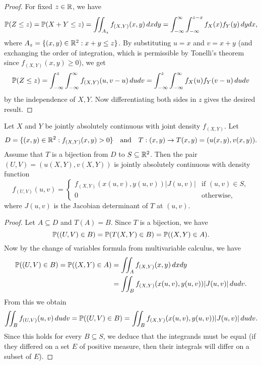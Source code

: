\begin{proof}
  For fixed $z \in \mathbb{R}$, we have
  \[
    \mathbb{P}(Z \le z) = \mathbb{P}(X + Y \le z)
    = \iint_{A_z} f_{(X, Y)}(x, y) \, dx dy
    = \int_{-\infty}^\infty \int_{-\infty}^{z - x} f_X(x) f_Y(y) \, dy dx,
  \]
  where $A_z = \{(x, y) \in \mathbb{R}^2 : x + y \le z\}$.
  By substituting $u = x$ and $v = x + y$ (and
  exchanging the order of integration, which is
  permissible by Tonelli's theorem since $f_{(X, Y)}(x, y) \ge 0$), we get
  \[
    \mathbb{P}(Z \le z)
    = \int_{-\infty}^z \int_{-\infty}^\infty f_{(X, Y)}(u, v - u) \, du dv
    = \int_{-\infty}^z \int_{-\infty}^\infty f_X(u) f_Y(v - u) \, du dv
  \]
  by the independence of $X, Y$. Now differentiating
  both sides in $z$ gives the desired result.
\end{proof}

\begin{theorem}
  Let $X$ and $Y$ be jointly absolutely continuous
  with joint density $f_{(X, Y)}$. Let
  \[
    D = \{(x, y) \in \mathbb{R}^2 : f_{(X, Y)}(x, y) > 0\}
    \quad \text{and} \quad
    T : (x, y) \to T(x, y) = (u(x, y), v(x, y)).
  \]
  Assume that $T$ is a bijection from
  $D$ to $S \subseteq \mathbb{R}^2$. Then the pair
  $(U, V) = (u(X, Y), v(X, Y))$ is jointly absolutely
  continuous with density function
  \[
    f_{(U, V)}(u, v) =
    \begin{cases}
      f_{(X, Y)}(x(u, v), y(u, v)) |J(u, v)| & \text{if $(u, v) \in S$}, \\
      0 & \text{otherwise},
    \end{cases}
  \]
  where $J(u, v)$ is the Jacobian determinant
  of $T$ at $(u, v)$.
\end{theorem}

\begin{proof}
  Let $A \subseteq D$ and $T(A) = B$. Since
  $T$ is a bijection, we have
  \[
    \mathbb{P}((U, V) \in B)
    = \mathbb{P}(T(X, Y) \in B)
    = \mathbb{P}((X, Y) \in A).
  \]
  Now by the change of variables formula from
  multivariable calculus, we have
  \begin{align*}
    \mathbb{P}((U, V) \in B)
    = \mathbb{P}((X, Y) \in A)
    &= \iint_A f_{(X, Y)}(x, y) \, dx dy \\
    &= \iint_B f_{(X, Y)}(x(u, v), y(u, v)) |J(u, v)| \, du dv.
  \end{align*}
  From this we obtain
  \[
    \iint_B f_{(U, V)}(u, v) \, du dv
    = \mathbb{P}((U, V) \in B)
    = \iint_B f_{(X, Y)}(x(u, v), y(u, v)) |J(u, v)| \, du dv.
  \]
  Since this holds for every $B \subseteq S$, we
  deduce that the integrands must be equal (if they
  differed on a set $E$ of positive measure, then their
  integrals will differ on a subset of $E$).
\end{proof}

